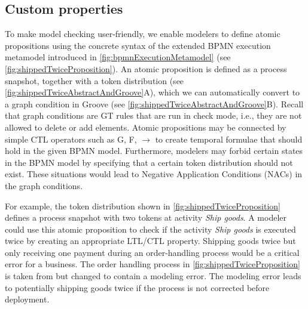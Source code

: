 \documentclass{lmcs} %
\begin{document}
\subsection{Custom properties} \label{subsec:customProperties}


To make model checking user-friendly, we enable modelers to define atomic propositions using the concrete syntax of the extended BPMN execution metamodel introduced in \autoref{fig:bpmnExecutionMetamodel} (see \autoref{fig:shippedTwiceProposition}).
An atomic proposition is defined as a process snapshot, together with a token distribution (see \autoref{fig:shippedTwiceAbstractAndGroove}A), which we can automatically convert to a graph condition in Groove (see \autoref{fig:shippedTwiceAbstractAndGroove}B).
Recall that graph conditions are GT rules that are run in check mode, i.e., they are not allowed to delete or add elements.
Atomic propositions may be connected by simple CTL operators such as \textsf{G, F, $\to$} to create temporal formulae that should hold in the given BPMN model. 
Furthermore, modelers may forbid certain states in the BPMN model by specifying that a certain token distribution should not exist.
These situations would lead to Negative Application Conditions (NACs) in the graph conditions. 


For example, the token distribution shown in \autoref{fig:shippedTwiceProposition} defines a process snapshot with two tokens at activity \textit{Ship goods}.
A modeler could use this atomic proposition to check if the activity \textit{Ship goods} is executed twice by creating an appropriate LTL/CTL property.
Shipping goods twice but only receiving one payment during an order-handling process would be a critical error for a business.
The order handling process in \autoref{fig:shippedTwiceProposition} is taken from \cite{ruckerPracticalProcessAutomation2021} but changed to contain a modeling error.
The modeling error leads to potentially shipping goods twice if the process is not corrected before deployment.
\end{document}

